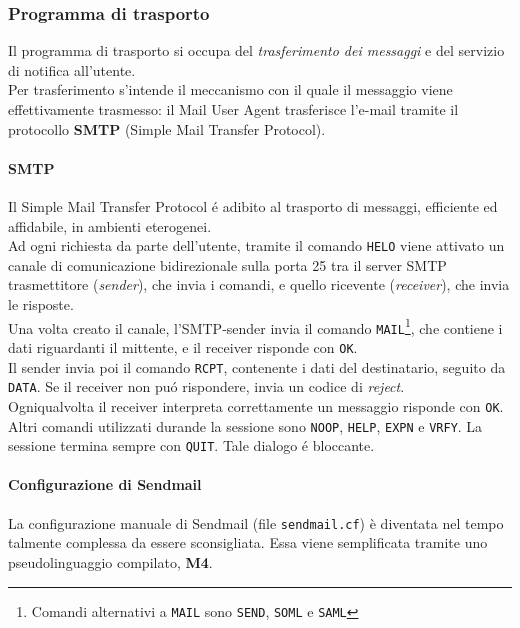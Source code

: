 \documentclass[a4paper,11pt]{article}
\def\code#1{\texttt{#1}}
\def\para#1{\paragraph{#1}\label{#1}}
\begin{document}
\subsubsection{Programma di trasporto} Il programma di trasporto si occupa del \textit{trasferimento dei messaggi} e del servizio di notifica all'utente.\\
Per trasferimento s'intende il meccanismo con il quale il messaggio viene effettivamente trasmesso: il Mail User Agent trasferisce l'e-mail tramite il protocollo \textbf{SMTP} (Simple Mail Transfer Protocol). 
\para{SMTP} Il Simple Mail Transfer Protocol  \'e adibito al trasporto di messaggi, efficiente ed affidabile, in ambienti eterogenei. \\
Ad ogni richiesta da parte dell'utente, tramite il comando \code{HELO} viene attivato un canale di comunicazione bidirezionale sulla porta 25 tra il server SMTP trasmettitore (\textit{sender}), che invia i comandi, e quello ricevente (\textit{receiver}), che invia le risposte.\\
Una volta creato il canale, l'SMTP-sender invia il comando \code{MAIL}\footnote{Comandi alternativi a \code{MAIL} sono \code{SEND}, \code{SOML} e \code{SAML}}, che contiene i dati riguardanti il mittente, e il receiver risponde con \code{OK}.\\
Il sender invia poi il comando \code{RCPT}, contenente i dati del destinatario, seguito da \code{DATA}. Se il receiver non pu\'o rispondere, invia un codice di \textit{reject}.\\ Ogniqualvolta il receiver interpreta correttamente un messaggio risponde con \code{OK}. Altri comandi utilizzati durande la sessione sono \code{NOOP}, \code{HELP}, \code{EXPN} e \code{VRFY}. La sessione termina sempre con \code{QUIT}. Tale dialogo \'e bloccante. 
\para{Configurazione di Sendmail}
La configurazione manuale di Sendmail (file \code{sendmail.cf}) è diventata nel tempo talmente complessa da essere sconsigliata. Essa viene semplificata tramite uno pseudolinguaggio compilato, \textbf{M4}.
\end{document}
